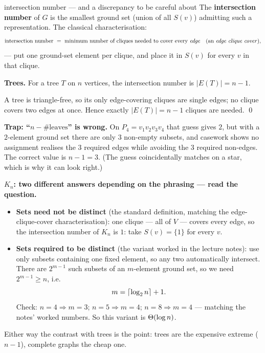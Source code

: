 \begin{facts}{intersection number --- and a discrepancy to be careful about}
The \textbf{intersection number} of $G$ is the smallest ground set (union of all $S(v)$) admitting
such a representation. The classical characterisation:
\[
  \text{intersection number}\ =\ \text{minimum number of cliques needed to cover every \emph{edge}}
  \quad(\text{an \emph{edge clique cover}}),
\]
--- put one ground-set element per clique, and place it in $S(v)$ for every $v$ in that clique.

\smallskip
\textbf{Trees.} For a tree $T$ on $n$ vertices, the intersection number is $|E(T)|=n-1$.

\prf A tree is triangle-free, so its only edge-covering cliques are single edges; no clique covers
two edges at once. Hence exactly $|E(T)|=n-1$ cliques are needed. \qed

\smallskip
\textbf{Trap: ``$n-\#\text{leaves}$'' is wrong.} On $P_4=v_1v_2v_3v_4$ that guess gives $2$, but
with a $2$-element ground set there are only $3$ non-empty subsets, and casework shows no
assignment realises the $3$ required edges while avoiding the $3$ required non-edges. The correct
value is $n-1=3$. (The guess coincidentally matches on a star, which is why it can look right.)

\smallskip
\textbf{$K_n$: two different answers depending on the phrasing --- read the question.}
\begin{itemize}
  \item \textbf{Sets need not be distinct} (the standard definition, matching the edge-clique-cover
        characterisation): one clique --- all of $V$ --- covers every edge, so the intersection
        number of $K_n$ is $\boxed{1}$: take $S(v)=\{1\}$ for every $v$.
  \item \textbf{Sets required to be distinct} (the variant worked in the lecture notes): use only
        subsets containing one fixed element, so any two automatically intersect. There are
        $2^{m-1}$ such subsets of an $m$-element ground set, so we need $2^{m-1}\ge n$, i.e.
        \[
          m=\left\lceil \log_2 n \right\rceil+1 .
        \]
        Check: $n=4\Rightarrow m=3$; $n=5\Rightarrow m=4$; $n=8\Rightarrow m=4$ --- matching the
        notes' worked numbers. So this variant is $\Theta(\log n)$.
\end{itemize}
Either way the contrast with trees is the point: trees are the expensive extreme ($n-1$), complete
graphs the cheap one.
\end{facts}

